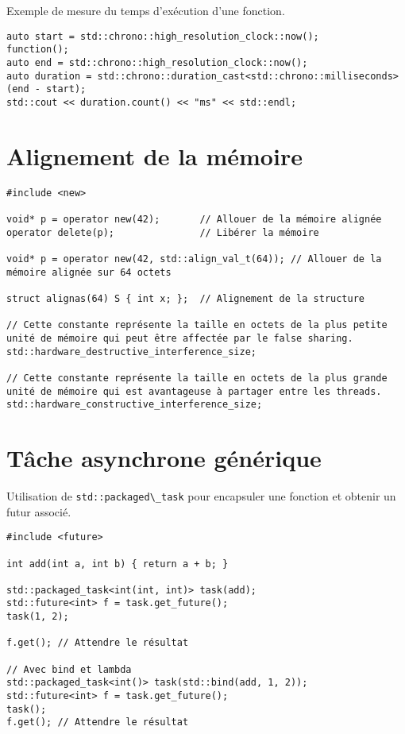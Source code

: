 \documentclass{article}
\newcommand{\cd}{\lstinline}
\begin{document}
\begin{multicols*}{3}
Exemple de mesure du temps d'exécution d'une fonction.

\begin{lstlisting}
auto start = std::chrono::high_resolution_clock::now();
function();
auto end = std::chrono::high_resolution_clock::now();
auto duration = std::chrono::duration_cast<std::chrono::milliseconds>(end - start);
std::cout << duration.count() << "ms" << std::endl;
\end{lstlisting}

\section*{Alignement de la mémoire}

\begin{lstlisting}
#include <new>

void* p = operator new(42);       // Allouer de la mémoire alignée
operator delete(p);               // Libérer la mémoire

void* p = operator new(42, std::align_val_t(64)); // Allouer de la mémoire alignée sur 64 octets

struct alignas(64) S { int x; };  // Alignement de la structure

// Cette constante représente la taille en octets de la plus petite unité de mémoire qui peut être affectée par le false sharing.
std::hardware_destructive_interference_size;

// Cette constante représente la taille en octets de la plus grande unité de mémoire qui est avantageuse à partager entre les threads.
std::hardware_constructive_interference_size;
\end{lstlisting}

\section*{Tâche asynchrone générique}
Utilisation de \cd{std::packaged\_task} pour encapsuler une fonction et obtenir un futur associé.

\begin{lstlisting}
#include <future>

int add(int a, int b) { return a + b; }

std::packaged_task<int(int, int)> task(add);
std::future<int> f = task.get_future();
task(1, 2);

f.get(); // Attendre le résultat

// Avec bind et lambda
std::packaged_task<int()> task(std::bind(add, 1, 2));
std::future<int> f = task.get_future();
task();
f.get(); // Attendre le résultat


\end{lstlisting}
\end{multicols*}
\end{document}
